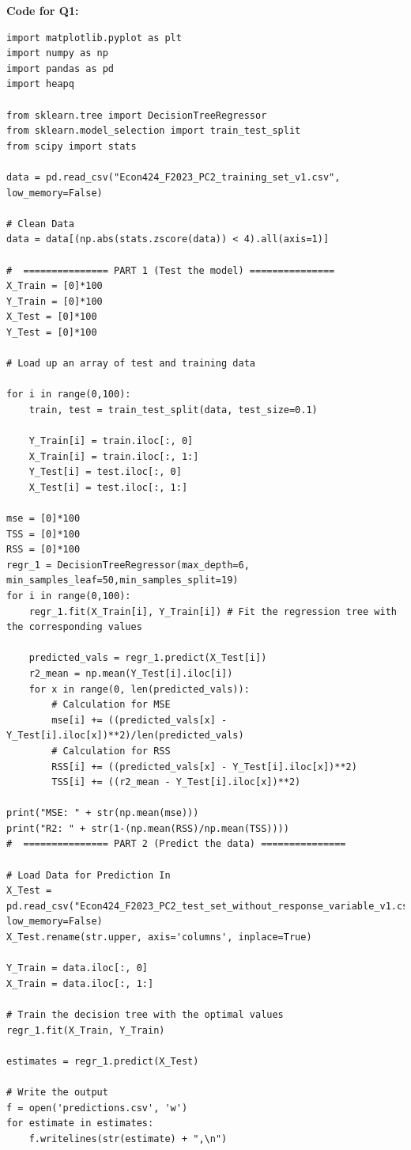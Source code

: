 \documentclass{article}
\begin{document}
\newpage
\textbf{Code for Q1:}
\begin{lstlisting}
import matplotlib.pyplot as plt
import numpy as np
import pandas as pd
import heapq

from sklearn.tree import DecisionTreeRegressor
from sklearn.model_selection import train_test_split
from scipy import stats

data = pd.read_csv("Econ424_F2023_PC2_training_set_v1.csv", low_memory=False)

# Clean Data
data = data[(np.abs(stats.zscore(data)) < 4).all(axis=1)]

#  =============== PART 1 (Test the model) ===============
X_Train = [0]*100
Y_Train = [0]*100
X_Test = [0]*100
Y_Test = [0]*100

# Load up an array of test and training data

for i in range(0,100):
    train, test = train_test_split(data, test_size=0.1)

    Y_Train[i] = train.iloc[:, 0]
    X_Train[i] = train.iloc[:, 1:]
    Y_Test[i] = test.iloc[:, 0]
    X_Test[i] = test.iloc[:, 1:]

mse = [0]*100
TSS = [0]*100
RSS = [0]*100
regr_1 = DecisionTreeRegressor(max_depth=6, min_samples_leaf=50,min_samples_split=19)
for i in range(0,100):
    regr_1.fit(X_Train[i], Y_Train[i]) # Fit the regression tree with the corresponding values

    predicted_vals = regr_1.predict(X_Test[i])
    r2_mean = np.mean(Y_Test[i].iloc[i])
    for x in range(0, len(predicted_vals)):
        # Calculation for MSE
        mse[i] += ((predicted_vals[x] - Y_Test[i].iloc[x])**2)/len(predicted_vals)
        # Calculation for RSS
        RSS[i] += ((predicted_vals[x] - Y_Test[i].iloc[x])**2)
        TSS[i] += ((r2_mean - Y_Test[i].iloc[x])**2)

print("MSE: " + str(np.mean(mse)))
print("R2: " + str(1-(np.mean(RSS)/np.mean(TSS))))
#  =============== PART 2 (Predict the data) ===============

# Load Data for Prediction In
X_Test = pd.read_csv("Econ424_F2023_PC2_test_set_without_response_variable_v1.csv", low_memory=False)
X_Test.rename(str.upper, axis='columns', inplace=True)

Y_Train = data.iloc[:, 0]
X_Train = data.iloc[:, 1:]

# Train the decision tree with the optimal values
regr_1.fit(X_Train, Y_Train)

estimates = regr_1.predict(X_Test)

# Write the output
f = open('predictions.csv', 'w')
for estimate in estimates:
    f.writelines(str(estimate) + ",\n")
\end{lstlisting}
\newpage
\end{document}
